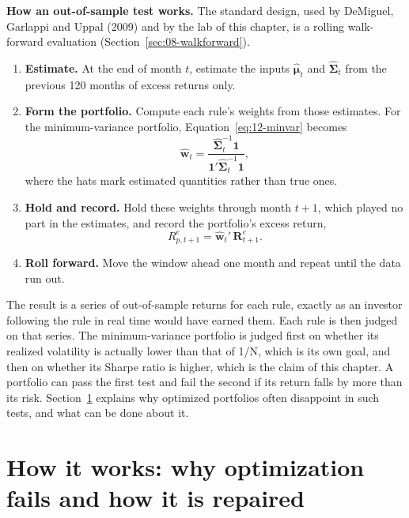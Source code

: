 \textbf{How an out-of-sample test works.} The standard design, used by DeMiguel, Garlappi and Uppal (2009) and by the lab of this chapter, is a rolling walk-forward evaluation (Section~\ref{sec:08-walkforward}).
\begin{enumerate}
  \item \textbf{Estimate.} At the end of month $t$, estimate the inputs $\hat{\boldsymbol{\mu}}_t$ and $\hat{\boldsymbol{\Sigma}}_t$ from the previous 120 months of excess returns only.
  \item \textbf{Form the portfolio.} Compute each rule's weights from those estimates. For the minimum-variance portfolio, Equation~\eqref{eq:12-minvar} becomes
  \begin{equation}
    \hat{\mathbf{w}}_t = \frac{\hat{\boldsymbol{\Sigma}}_t^{-1}\mathbf{1}}{\mathbf{1}'\hat{\boldsymbol{\Sigma}}_t^{-1}\mathbf{1}},
    \label{eq:12-minvar-hat}
  \end{equation}
  where the hats mark estimated quantities rather than true ones.
  \item \textbf{Hold and record.} Hold these weights through month $t+1$, which played no part in the estimates, and record the portfolio's excess return,
  \begin{equation}
    R^{e}_{p,t+1} = \hat{\mathbf{w}}_t'\,\mathbf{R}^{e}_{t+1}.
    \label{eq:12-oos-return}
  \end{equation}
  \item \textbf{Roll forward.} Move the window ahead one month and repeat until the data run out.
\end{enumerate}
The result is a series of out-of-sample returns for each rule, exactly as an investor following the rule in real time would have earned them. Each rule is then judged on that series. The minimum-variance portfolio is judged first on whether its realized volatility is actually lower than that of 1/N, which is its own goal, and then on whether its Sharpe ratio is higher, which is the claim of this chapter. A portfolio can pass the first test and fail the second if its return falls by more than its risk. Section~\ref{sec:12-how} explains why optimized portfolios often disappoint in such tests, and what can be done about it.

\section{How it works: why optimization fails and how it is repaired}
\label{sec:12-how}

